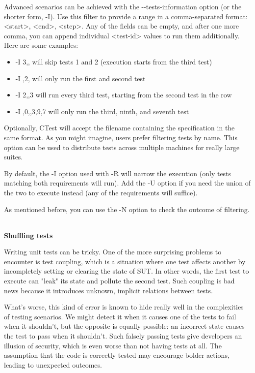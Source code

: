 Advanced scenarios can be achieved with the -{}-tests-information option (or the shorter form, -I). Use this filter to provide a range in a comma-separated format: <start>, <end>, <step>. Any of the fields can be empty, and after one more comma, you can append individual <test-id> values to run them additionally. Here are some examples:

\begin{itemize}
\item 
-I 3,, will skip tests 1 and 2 (execution starts from the third test)

\item 
-I ,2, will only run the first and second test

\item 
-I 2,,3 will run every third test, starting from the second test in the row

\item 
-I ,0,,3,9,7 will only run the third, ninth, and seventh test
\end{itemize}

Optionally, CTest will accept the filename containing the specification in the same format. As you might imagine, users prefer filtering tests by name. This option can be used to distribute tests across multiple machines for really large suites.

By default, the -I option used with -R will narrow the execution (only tests matching both requirements will run). Add the -U option if you need the union of the two to execute instead (any of the requirements will suffice).

As mentioned before, you can use the -N option to check the outcome of filtering.

\hspace*{\fill} \\ %
\noindent
\textbf{Shuffling tests}

Writing unit tests can be tricky. One of the more surprising problems to encounter is test coupling, which is a situation where one test affects another by incompletely setting or clearing the state of SUT. In other words, the first test to execute can "leak" its state and pollute the second test. Such coupling is bad news because it introduces unknown, implicit relations between tests.

What's worse, this kind of error is known to hide really well in the complexities of testing scenarios. We might detect it when it causes one of the tests to fail when it shouldn't, but the opposite is equally possible: an incorrect state causes the test to pass when it shouldn't. Such falsely passing tests give developers an illusion of security, which is even worse than not having tests at all. The assumption that the code is correctly tested may encourage bolder actions, leading to unexpected outcomes.

